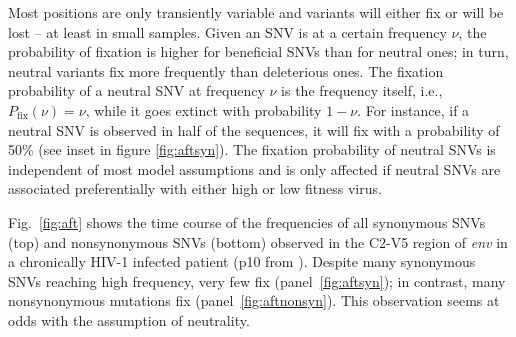 \documentclass[11pt]{article}
\newcommand{\pfix}{P_{\mathrm{fix}}}
\newcommand{\FIG}[1]{Fig.~\ref{fig:#1}}
\newcommand{\env}{\textit{env}}
\newcommand{\shankaregion}{C2-V5}
\begin{document}
Most positions are only transiently variable and variants will either fix or
will be lost -- at least in small samples. Given an SNV is at a certain
frequency $\nu$, the probability of fixation is higher for beneficial
SNVs than for neutral ones; in turn, neutral variants fix more frequently than
deleterious ones. The fixation probability of a
neutral SNV at frequency $\nu$ is the frequency itself, i.e.,
$\pfix(\nu) = \nu$, while it goes extinct with probability $1-\nu$. For
instance, if a neutral SNV is observed in half of the sequences, it will
fix with a probability of 50\% (see inset in figure
\ref{fig:aftsyn}). The fixation probability of neutral SNVs is
independent of most model assumptions and is only affected if neutral
SNVs are associated preferentially with either high or low fitness
virus.

\FIG{aft} shows the time course of the frequencies of all synonymous
SNVs (top) and nonsynonymous SNVs (bottom) observed in the
\shankaregion{} region of \env{} in a chronically HIV-1 infected patient (p10 from
\citet{shankarappa_consistent_1999}). Despite many synonymous SNVs
reaching high frequency, very few fix (panel~\ref{fig:aftsyn}); in
contrast, many nonsynonymous mutations fix
(panel~\ref{fig:aftnonsyn}). This observation seems at odds with
the assumption of neutrality.

\end{document}
